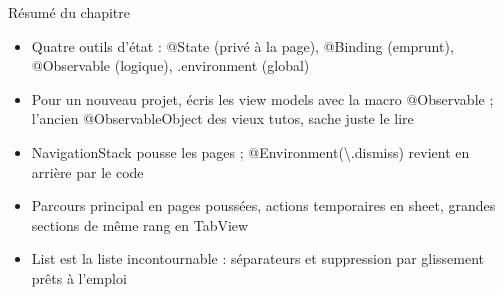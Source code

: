 \begin{tcbsummary}{Résumé du chapitre}
\begin{itemize}
  \item Quatre outils d'état : @State (privé à la page), @Binding (emprunt), @Observable (logique), .environment (global)
  \item Pour un nouveau projet, écris les view models avec la macro @Observable ; l'ancien @ObservableObject des vieux tutos, sache juste le lire
  \item NavigationStack pousse les pages ; @Environment(\textbackslash{}.dismiss) revient en arrière par le code
  \item Parcours principal en pages poussées, actions temporaires en sheet, grandes sections de même rang en TabView
  \item List est la liste incontournable : séparateurs et suppression par glissement prêts à l'emploi
\end{itemize}

\end{tcbsummary}
